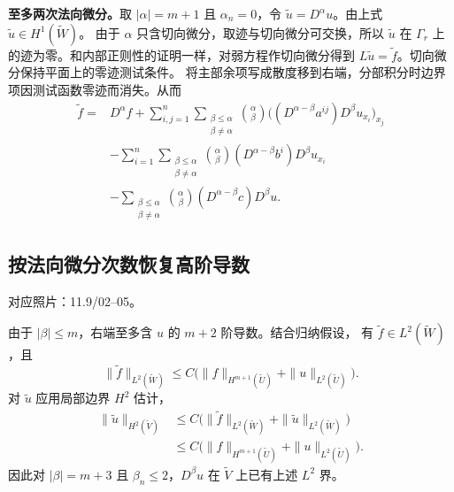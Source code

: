 \documentclass[UTF8,a4paper,11pt,fontset=fandol]{ctexart}
\newcommand{\source}[1]{{\small\color{notegray}对应照片：#1。}\par}
\begin{document}
\textbf{至多两次法向微分。}取 $|\alpha|=m+1$ 且 $\alpha_n=0$，令
$\widetilde u=D^\alpha u$。由上式 $\widetilde u\in H^1(\widetilde W)$。
由于 $\alpha$ 只含切向微分，取迹与切向微分可交换，所以 $\widetilde u$ 在
$\Gamma_r$ 上的迹为零。和内部正则性的证明一样，对弱方程作切向微分得到
$L\widetilde u=\widetilde f$。切向微分保持平面上的零迹测试条件。
将主部余项写成散度移到右端，分部积分时边界项因测试函数零迹而消失。从而
\[
\begin{aligned}
\widetilde f={}&D^\alpha f
+\sum_{i,j=1}^n\sum_{\substack{\beta\le\alpha\\\beta\ne\alpha}}
\binom\alpha\beta\bigl((D^{\alpha-\beta}a^{ij})D^\beta u_{x_i}\bigr)_{x_j}\\
&-\sum_{i=1}^n\sum_{\substack{\beta\le\alpha\\\beta\ne\alpha}}
\binom\alpha\beta(D^{\alpha-\beta}b^i)D^\beta u_{x_i}\\
&-\sum_{\substack{\beta\le\alpha\\\beta\ne\alpha}}
\binom\alpha\beta(D^{\alpha-\beta}c)D^\beta u.
\end{aligned}
\]

\newpage
\subsection{按法向微分次数恢复高阶导数}
\source{11.9/02--05}
由于 $|\beta|\le m$，右端至多含 $u$ 的 $m+2$ 阶导数。结合归纳假设，
有 $\widetilde f\in L^2(\widetilde W)$，且
\[
\|\widetilde f\|_{L^2(\widetilde W)}
\le C\bigl(\|f\|_{H^{m+1}(\widetilde U)}+\|u\|_{L^2(\widetilde U)}\bigr).
\]
对 $\widetilde u$ 应用局部边界 $H^2$ 估计，
\[
\begin{aligned}
\|\widetilde u\|_{H^2(\widetilde V)}
&\le C\bigl(\|\widetilde f\|_{L^2(\widetilde W)}
            +\|\widetilde u\|_{L^2(\widetilde W)}\bigr)\\
&\le C\bigl(\|f\|_{H^{m+1}(\widetilde U)}+\|u\|_{L^2(\widetilde U)}\bigr).
\end{aligned}
\]
因此对 $|\beta|=m+3$ 且 $\beta_n\le2$，$D^\beta u$ 在 $\widetilde V$ 上已有上述 $L^2$ 界。
\end{document}
